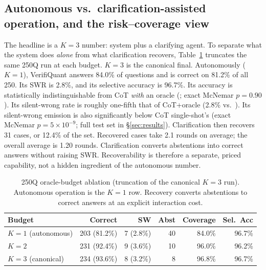 \subsection{Autonomous vs.\ clarification-assisted operation, and the risk--coverage view}\label{sec:kablation}
The headline \vqAccAll{} is a $K{=}3$ number: system plus a clarifying agent.
To separate what the system does \emph{alone} from what clarification recovers, Table~\ref{tab:kablation250} truncates the same 250Q run at each budget.
$K{=}3$ is the canonical final.
Autonomously ($K{=}1$), VerifiQuant answers 84.0\% of questions and is correct on 81.2\% of all 250.
Its SWR is 2.8\%, and its selective accuracy is 96.7\%.
Its accuracy is statistically indistinguishable from CoT \emph{with} an oracle (\cotoAccAll{}; exact McNemar $p{=}0.90$).
Its silent-wrong rate is roughly one-fifth that of CoT+oracle (2.8\% vs.\ \cotoSWRAll{}).
Its silent-wrong emission is also significantly below CoT single-shot's (exact McNemar $p{=}5{\times}10^{-9}$; full test set in \S\ref{sec:results}).
Clarification then recovers 31 cases, or 12.4\% of the set.
Recovered cases take 2.1 rounds on average; the overall average is 1.20 rounds.
Clarification converts abstentions into correct answers without raising SWR.
Recoverability is therefore a separate, priced capability, not a hidden ingredient of the autonomous number.

\begin{table}[t]
\caption{250Q oracle-budget ablation (truncation of the canonical $K{=}3$ run).
Autonomous operation is the $K{=}1$ row.
Recovery converts abstentions to correct answers at an explicit interaction cost.}
\label{tab:kablation250}
\small
\begin{tabular}{@{}lrrrrr@{}}
\toprule
Budget & Correct & SW & Abst & Coverage & Sel.\ Acc \\
\midrule
$K{=}1$ (autonomous) & 203 (81.2\%) & 7 (2.8\%) & 40 & 84.0\% & 96.7\% \\
$K{=}2$ & 231 (92.4\%) & 9 (3.6\%) & 10 & 96.0\% & 96.2\% \\
$K{=}3$ (canonical) & 234 (93.6\%) & 8 (3.2\%) & 8 & 96.8\% & 96.7\% \\
\bottomrule
\end{tabular}
\end{table}

